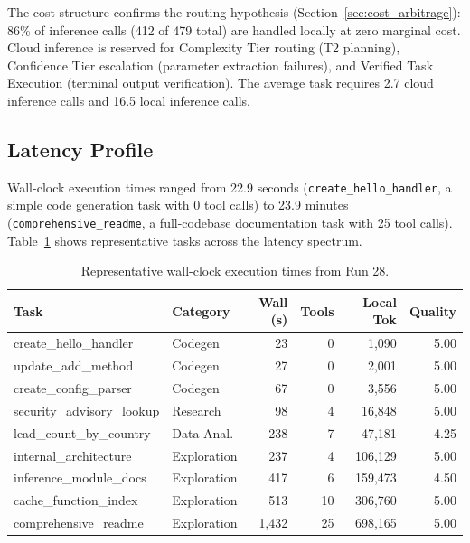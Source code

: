 \documentclass{article}
\begin{document}
The cost structure confirms the routing hypothesis (Section~\ref{sec:cost_arbitrage}): 86\% of inference calls (412 of 479 total) are handled locally at zero marginal cost.
Cloud inference is reserved for Complexity Tier routing (T2 planning), Confidence Tier escalation (parameter extraction failures), and Verified Task Execution (terminal output verification).
The average task requires 2.7 cloud inference calls and 16.5 local inference calls.

\subsection{Latency Profile}
\label{sec:eval_latency}

Wall-clock execution times ranged from 22.9 seconds (\texttt{create\_hello\_handler}, a simple code generation task with 0 tool calls) to 23.9 minutes (\texttt{comprehensive\_readme}, a full-codebase documentation task with 25 tool calls).
Table~\ref{tab:latency} shows representative tasks across the latency spectrum.

\begin{table}[h]
\centering
\caption{Representative wall-clock execution times from Run 28.}
\label{tab:latency}
\small
\begin{tabular}{@{}llrrrr@{}}
\toprule
\textbf{Task} & \textbf{Category} & \textbf{Wall (s)} & \textbf{Tools} & \textbf{Local Tok} & \textbf{Quality} \\
\midrule
create\_hello\_handler & Codegen & 23 & 0 & 1,090 & 5.00 \\
update\_add\_method & Codegen & 27 & 0 & 2,001 & 5.00 \\
create\_config\_parser & Codegen & 67 & 0 & 3,556 & 5.00 \\
security\_advisory\_lookup & Research & 98 & 4 & 16,848 & 5.00 \\
lead\_count\_by\_country & Data Anal. & 238 & 7 & 47,181 & 4.25 \\
internal\_architecture & Exploration & 237 & 4 & 106,129 & 5.00 \\
inference\_module\_docs & Exploration & 417 & 6 & 159,473 & 4.50 \\
cache\_function\_index & Exploration & 513 & 10 & 306,760 & 5.00 \\
comprehensive\_readme & Exploration & 1,432 & 25 & 698,165 & 5.00 \\
\bottomrule
\end{tabular}
\end{table}
\end{document}
